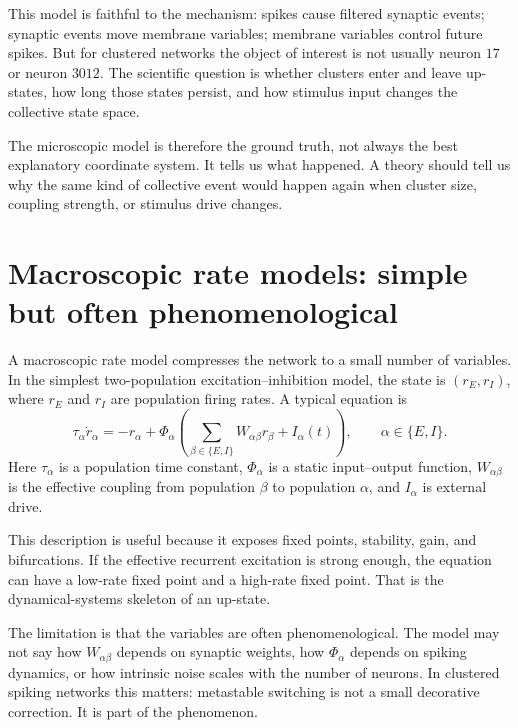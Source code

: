 This model is faithful to the mechanism: spikes cause filtered synaptic events; synaptic events move membrane variables; membrane variables control future spikes. But for clustered networks the object of interest is not usually neuron $17$ or neuron $3012$. The scientific question is whether clusters enter and leave up-states, how long those states persist, and how stimulus input changes the collective state space.

The microscopic model is therefore the ground truth, not always the best explanatory coordinate system. It tells us what happened. A theory should tell us why the same kind of collective event would happen again when cluster size, coupling strength, or stimulus drive changes.

\section{Macroscopic rate models: simple but often phenomenological}
\label{sec:macroscopic-rate-models-simple}

A macroscopic rate model compresses the network to a small number of variables. In the simplest two-population excitation--inhibition model, the state is $(r_E,r_I)$, where $r_E$ and $r_I$ are population firing rates. A typical equation is
%
\begin{equation}
  \tau_\alpha \dot r_\alpha
  =
  -r_\alpha
  +
  \Phi_\alpha\!\left(
    \sum_{\beta\in\{E,I\}} W_{\alpha\beta} r_\beta
    + I_\alpha(t)
  \right),
  \qquad \alpha\in\{E,I\}.
  \label{eq:macroscopic-rate-model}
\end{equation}
%
Here $\tau_\alpha$ is a population time constant, $\Phi_\alpha$ is a static input--output function, $W_{\alpha\beta}$ is the effective coupling from population $\beta$ to population $\alpha$, and $I_\alpha$ is external drive.

This description is useful because it exposes fixed points, stability, gain, and bifurcations. If the effective recurrent excitation is strong enough, the equation can have a low-rate fixed point and a high-rate fixed point. That is the dynamical-systems skeleton of an up-state.

The limitation is that the variables are often phenomenological. The model may not say how $W_{\alpha\beta}$ depends on synaptic weights, how $\Phi_\alpha$ depends on spiking dynamics, or how intrinsic noise scales with the number of neurons. In clustered spiking networks this matters: metastable switching is not a small decorative correction. It is part of the phenomenon.

